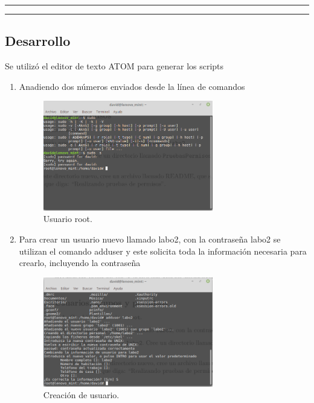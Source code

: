 \documentclass[11pt]{article}
\begin{document}


\tableofcontents
\hspace{5mm}
\hrule
\hrule



\subsection{Desarrollo}

Se utilizó el editor de texto ATOM para generar los scripts

\begin{enumerate}
\item Anadiendo dos números enviados desde la línea de comandos

\begin{figure}[H]
  \centering
    \includegraphics[width=0.7\textwidth]{img/1}
  \caption{Usuario root.}
\end{figure}

\item  Para crear un usuario nuevo llamado labo2, con la contraseña labo2 se utilizan el comando adduser y este solicita toda la información necesaria para crearlo, incluyendo la contraseña
\begin{figure}[H]
  \centering
    \includegraphics[width=0.7\textwidth]{img/2}
  \caption{Creación de usuario.}
 

\end{figure}
\end{enumerate}
\end{document}
